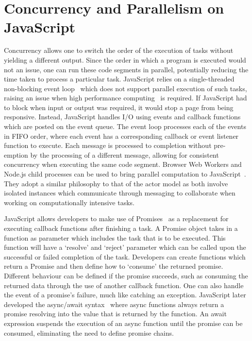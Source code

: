 \documentclass[oneside]{um-fict}
\begin{document}
\section{Concurrency and Parallelism on JavaScript}
Concurrency allows one to switch the order of the execution of tasks without yielding a different output. Since the order in which a program is executed would not an issue, one can run these code segments in parallel, potentially reducing the time taken to process a particular task. JavaScript relies on a single-threaded non-blocking event loop~\cite{eventloopbrowser}\cite{eventloopnode} which does not support parallel execution of such tasks, raising an issue when high performance computing~\cite{highperformance} is required. If JavaScript had to block when input or output was required, it would stop a page from being responsive. Instead, JavaScript handles I/O using events and callback functions which are posted on the event queue. The event loop processes each of the events in FIFO order, where each event has a corresponding callback or event listener function to execute. Each message is processed to completion without pre-emption by the processing of a different message, allowing for consistent concurrency when executing the same code segment. Browser Web Workers\cite{webworkers} and Node.js child processes\cite{cluster} can be used to bring parallel computation to JavaScript~\cite{concurrencyjs}\cite{spidersjs}. They adopt a similar philosophy to that of the actor model as both involve isolated instances which communicate through messaging to collaborate when working on computationally intensive tasks.

JavaScript allows developers to make use of Promises~\cite{promises} as a replacement for executing callback functions after finishing a task. A Promise object takes in a function as parameter which includes the task that is to be executed. This function will have a `resolve' and `reject' parameter which can be called upon the successful or failed completion of the task. Developers can create functions which return a Promise and then define how to `consume' the returned promise. Different behaviour can be defined if the promise succeeds, such as consuming the returned data through the use of another callback function. One can also handle the event of a promise's failure, much like catching an exception. JavaScript later developed the async/await syntax~\cite{async} where async functions always return a promise resolving into the value that is returned by the function. An await expression suspends the execution of an async function until the promise can be consumed, eliminating the need to define promise chains.
\end{document}
